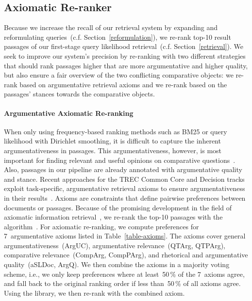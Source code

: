 \subsection{Axiomatic Re-ranker}
\label{reranking}


Because we increase the recall of our retrieval system by expanding and reformulating queries~(c.f. Section~\ref{reformulation}), we re-rank top-10 result passages of our first-stage query likelihood retrieval~(c.f. Section~\ref{retrieval}).
We seek to improve our system's precision by re-ranking with two different strategies that should rank passages higher that are more argumentative and higher quality, but also ensure a fair overview of the two conflicting comparative objects: \Ni we re-rank based on argumentative retrieval axioms and \Nii we re-rank based on the passages' stances towards the comparative objects.

\paragraph{Argumentative Axiomatic Re-ranking}

When only using frequency-based ranking methods such as BM25 or query likelihood with Dirichlet smoothing, it is difficult to capture the inherent argumentativeness in passages.
This argumentativeness, however, is most important for finding relevant and useful opinions on comparative questions~\cite{BondarenkoFKSGBPBSWPH2022}.
Also, passages in our pipeline are already annotated with argumentative quality and stance.
Recent approaches for the TREC Common Core and Decision tracks exploit task-specific, argumentative retrieval axioms to ensure argumentativeness in their results~\cite{BondarenkoHVSPB2018,BondarenkoFKHVS2019}.
Axioms are constraints that define pairwise preferences between documents or passages.
Because of the promising development in the field of axiomatic information retrieval~\cite{BondarenkoFRSVH2022}, we re-rank the top-10 passages with the \KwikSort algorithm~\cite{HagenVGS2016}.
For axiomatic re-ranking, we compute preferences for 7~argumentative axioms listed in Table~\ref{table-axioms}.
The axioms cover general argumentativeness~(ArgUC), argumentative relevance~(QTArg, QTPArg), comparative relevance~(CompArg, CompPArg), and rhetorical and argumentative quality~(aSLDoc, ArgQ).
We then combine the axioms in a majority voting scheme, i.e., we only keep preferences where at least~50\,\% of the 7~axioms agree, and fall back to the original ranking order if less than~50\,\% of all axioms agree.
Using the \iraxioms library, we then re-rank with the combined axiom.

